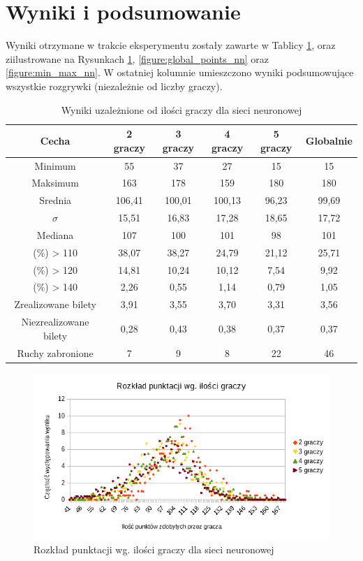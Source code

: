 \documentclass[12pt, oneside]{report}
\begin{document}
\section{Wyniki i podsumowanie} 
Wyniki otrzymane w trakcie eksperymentu zostały zawarte w Tablicy \ref{table:nn_sizeresult}, oraz ziilustrowane na Rysunkach \ref{figure:player_points_nn}, \ref{figure:global_points_nn} oraz \ref{figure:min_max_nn}.
W ostatniej kolumnie umieszczono wyniki podsumowujące wszystkie rozgrywki (niezależnie od liczby graczy).

\begin{table}[h]
	\begin{center}
		\begin{tabular}{| c | c | c | c | c | c |} \hline
			Cecha & 2 graczy & 3 graczy & 4 graczy & 5 graczy & Globalnie \\ \hline
			Minimum & 55 & 37 & 27 & 15 & 15 \\ \hline
			Maksimum & 163 & 178 & 159 & 180 & 180 \\ \hline
			Srednia & 106,41 & 100,01 & 100,13 & 96,23 & 99,69 \\ \hline
			\begin{math}\sigma\end{math} & 15,51 & 16,83 & 17,28 & 18,65 & 17,72 \\ \hline 
			Mediana & 107 & 100 & 101 & 98 & 101 \\ \hline
			(\%) > 110 & 38,07 & 38,27 & 24,79 & 21,12 & 25,71 \\ \hline
			(\%) > 120 & 14,81 & 10,24 & 10,12 & 7,54 & 9,92 \\ \hline
			(\%) > 140 & 2,26 & 0,55 & 1,14 & 0,79 & 1,05 \\ \hline
			Zrealizowane bilety & 3,91 & 3,55 & 3,70 & 3,31 & 3,56 \\ \hline
			Niezrealizowane bilety & 0,28 & 0,43 & 0,38 & 0,37 & 0,37 \\ \hline
			Ruchy zabronione & 7&9&8&22&46 \\ \hline
		\end{tabular}
		\caption{Wyniki uzależnione od ilości graczy dla sieci neuronowej}
		\label{table:nn_sizeresult}
	\end{center}
\end{table}

\begin{figure}[h]
	\includegraphics[width=\linewidth]{NNWykrespunktow.png}
	\caption{Rozkład punktacji wg. ilości graczy dla sieci neuronowej}
	\label{figure:player_points_nn}
\end{figure}
\end{document}
